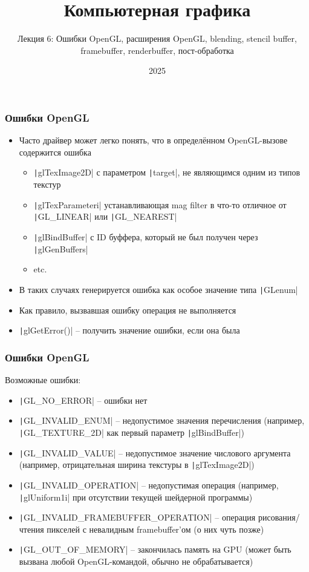 \documentclass[10pt]{beamer}
\title{Компьютерная графика}
\subtitle{Лекция 6: Ошибки OpenGL, расширения OpenGL, blending, stencil buffer, framebuffer, renderbuffer, пост-обработка}
\date{2025}
\begin{document}
\frame{\titlepage}


\begin{frame}[fragile]
\frametitle{Ошибки OpenGL}
\begin{itemize}
\item Часто драйвер может легко понять, что в определённом OpenGL-вызове содержится ошибка
\pause
\begin{itemize}
\item \texttt|glTexImage2D| с параметром \texttt|target|, не являющимся одним из типов текстур
\pause
\item \texttt|glTexParameteri| устанавливающая mag filter в что-то отличное от \texttt|GL_LINEAR| или \texttt|GL_NEAREST|
\pause
\item \texttt|glBindBuffer| с ID буффера, который не был получен через \texttt|glGenBuffers|
\pause
\item etc.
\end{itemize}
\pause
\item В таких случаях генерируется ошибка как особое значение типа \texttt|GLenum|
\pause
\item Как правило, вызвавшая ошибку операция не выполняется
\pause
\item \texttt|glGetError()| -- получить значение ошибки, если она была
\end{itemize}
\end{frame}

\begin{frame}[fragile]
\frametitle{Ошибки OpenGL}
Возможные ошибки:
\begin{itemize}
\item \texttt|GL_NO_ERROR| -- ошибки нет
\pause
\item \texttt|GL_INVALID_ENUM| -- недопустимое значения перечисления (например, \texttt|GL_TEXTURE_2D| как первый параметр \texttt|glBindBuffer|)
\pause
\item \texttt|GL_INVALID_VALUE| -- недопустимое значение числового аргумента (например, отрицательная ширина текстуры в \texttt|glTexImage2D|)
\pause
\item \texttt|GL_INVALID_OPERATION| -- недопустимая операция (например, \texttt|glUniform1i| при отсутствии текущей шейдерной программы)
\pause
\item \texttt|GL_INVALID_FRAMEBUFFER_OPERATION| -- операция рисования/чтения пикселей с невалидным framebuffer'ом (о них чуть позже)
\pause
\item \texttt|GL_OUT_OF_MEMORY| -- закончилась память на GPU (может быть вызвана любой OpenGL-командой, обычно не обрабатывается)
\end{itemize}
\end{frame}
\end{document}
